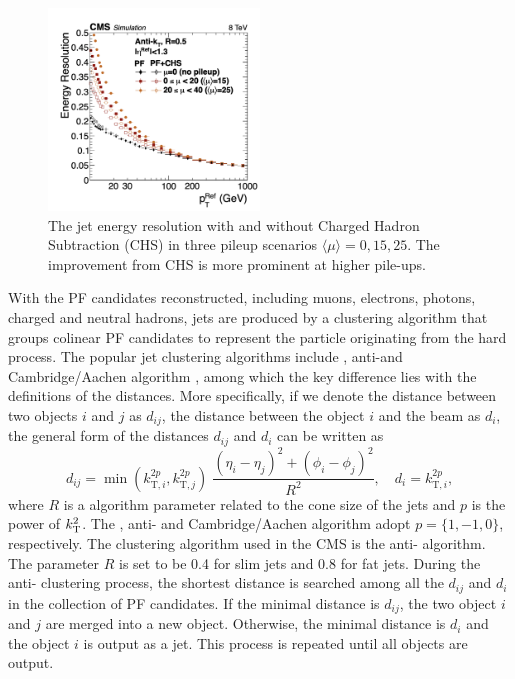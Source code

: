 \begin{figure}[ht]
    \centering
    \includegraphics[width=0.5\textwidth]{chapters/CMSExperiment/sectionReconstruction/figures/jetres_pf_chs}
    \caption{ The jet energy resolution \cite{cms:particleflow:Sirunyan:2017ulk} with and without Charged Hadron Subtraction (CHS) in three pileup scenarios $\langle \mu\rangle =0,15,25$. The improvement from CHS is more prominent at higher pile-ups.  }
    \label{fig:cmsExperiment:reconstruction:resJet}
\end{figure}



With the PF candidates reconstructed, including muons, electrons, photons, charged and neutral hadrons, jets are produced by a clustering algorithm that groups colinear PF candidates to represent the particle originating from the hard process. The popular jet clustering algorithms include \kt, anti-\kt and Cambridge/Aachen algorithm \cite{tech:antikt:Cacciari:2008gp}, among which the key difference lies with the definitions of the distances. More specifically, if we denote the distance between two objects $i$ and $j$ as $d_{ij}$, the distance between the object $i$ and the beam as $d_i$,  the general form of the distances $d_{ij}$ and $d_i$ can be written as
\begin{equation}
	d_{ij} = \min(k^{2p} _{\mathrm{T},i}, k^{2p}_{\mathrm{T},j}) \; \frac{(\eta_i-\eta_j) ^2 + (\phi_i-\phi_j) ^2}{R^2} , \quad d_i =k^{2p} _{\mathrm{T},i},
\end{equation}
\noindent where $R$ is a algorithm parameter related to the cone size of the jets and $p$ is the power of $k_{\mathrm{T}}^2$. The  \kt, anti- \kt and Cambridge/Aachen algorithm adopt $p=\{1,-1,0\}$, respectively. The clustering algorithm used in the CMS is the anti- \kt algorithm. The parameter $R$ is set to be 0.4 for slim jets and 0.8 for fat jets. During the anti- \kt clustering process, the shortest distance is searched among all the $d_{ij}$ and $d_i$ in the collection of PF candidates. If the minimal distance is $d_{ij}$, the two object $i$ and $j$ are merged into a new object. Otherwise, the minimal distance is $d_{i}$ and the object $i$ is output as a jet. This process is repeated until all objects are output. 

